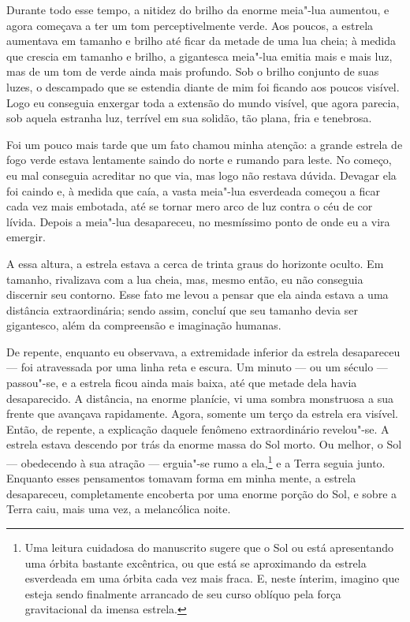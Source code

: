 Durante todo esse tempo, a nitidez do brilho da enorme meia"-lua aumentou, e agora começava a ter um tom
perceptivelmente verde. Aos poucos, a estrela aumentava em tamanho e brilho até ficar da metade de uma lua cheia; à
medida que crescia em tamanho e brilho, a gigantesca meia"-lua emitia mais e mais luz, mas de um tom de verde ainda mais
profundo. Sob o brilho conjunto de suas luzes, o descampado que se estendia diante de mim foi ficando aos poucos
visível. Logo eu conseguia enxergar toda a extensão do mundo visível, que agora parecia, sob aquela estranha luz,
terrível em sua solidão, tão plana, fria e tenebrosa.

Foi um pouco mais tarde que um fato chamou minha atenção: a grande estrela de fogo verde estava lentamente saindo do
norte e rumando para leste. No começo, eu mal conseguia acreditar no que via, mas logo não restava dúvida. Devagar
ela foi caindo e, à medida que caía, a vasta meia"-lua esverdeada começou a ficar cada vez mais embotada, até se tornar
mero arco de luz contra o céu de cor lívida. Depois a meia"-lua desapareceu, no mesmíssimo ponto de onde eu a vira
emergir.

A essa altura, a estrela estava a cerca de trinta graus do horizonte oculto. Em tamanho, rivalizava com a lua cheia,
mas, mesmo então, eu não conseguia discernir seu contorno. Esse fato me levou a pensar que ela ainda estava a uma
distância extraordinária; sendo assim, concluí que seu tamanho devia ser gigantesco, além da compreensão e imaginação
humanas.

De repente, enquanto eu observava, a extremidade inferior da estrela desapareceu --- foi atravessada por uma linha reta e
escura. Um minuto --- ou um século --- passou"-se, e a estrela ficou ainda mais baixa, até que metade dela havia
desaparecido. A distância, na enorme planície, vi uma sombra monstruosa a sua frente que avançava rapidamente. Agora,
somente um terço da estrela era visível. Então, de repente, a explicação daquele fenômeno extraordinário revelou"-se.
A estrela estava descendo por trás da enorme massa do Sol morto. Ou melhor, o Sol --- obedecendo à sua atração ---
erguia"-se rumo a ela,\footnote{ Uma leitura cuidadosa do manuscrito sugere que
o Sol ou está apresentando uma órbita bastante excêntrica, ou que está se
aproximando da estrela esverdeada em uma órbita cada vez mais fraca. E, neste
ínterim, imagino que esteja sendo finalmente arrancado de seu curso oblíquo
pela força gravitacional da imensa estrela.} e a Terra seguia junto.
Enquanto esses pensamentos tomavam forma em minha mente, a estrela
desapareceu, completamente encoberta por uma enorme porção do Sol, e sobre a Terra caiu, mais uma vez, a melancólica
noite.

